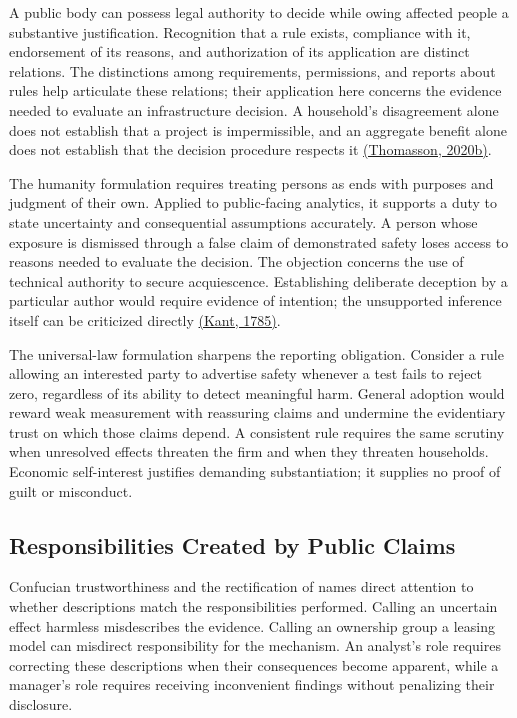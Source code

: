 A public body can possess legal authority to decide while owing affected
people a substantive justification. Recognition that a rule exists,
compliance with it, endorsement of its reasons, and authorization of its
application are distinct relations. The distinctions among requirements,
permissions, and reports about rules help articulate these relations;
their application here concerns the evidence needed to evaluate an
infrastructure decision. A household's disagreement alone does not
establish that a project is impermissible, and an aggregate benefit
alone does not establish that the decision procedure respects it
\href{https://academic.oup.com/book/33564}{(Thomasson, 2020b)}.

The humanity formulation requires treating persons as ends with purposes
and judgment of their own. Applied to public-facing analytics, it
supports a duty to state uncertainty and consequential assumptions
accurately. A person whose exposure is dismissed through a false claim
of demonstrated safety loses access to reasons needed to evaluate the
decision. The objection concerns the use of technical authority to
secure acquiescence. Establishing deliberate deception by a particular
author would require evidence of intention; the unsupported inference
itself can be criticized directly
\href{https://www.gutenberg.org/files/5682/5682-h/5682-h.htm}{(Kant,
1785)}.

The universal-law formulation sharpens the reporting obligation.
Consider a rule allowing an interested party to advertise safety
whenever a test fails to reject zero, regardless of its ability to
detect meaningful harm. General adoption would reward weak measurement
with reassuring claims and undermine the evidentiary trust on which
those claims depend. A consistent rule requires the same scrutiny when
unresolved effects threaten the firm and when they threaten households.
Economic self-interest justifies demanding substantiation; it supplies
no proof of guilt or misconduct.

\hypertarget{M09-responsibilities-created-by-public-claims}{%
\subsection{Responsibilities Created by Public
Claims}\label{M09-responsibilities-created-by-public-claims}}

\noindent \noindent Confucian trustworthiness and the rectification of names
direct attention to whether descriptions match the responsibilities
performed. Calling an uncertain effect harmless misdescribes the
evidence. Calling an ownership group a leasing model can misdirect
responsibility for the mechanism. An analyst's role requires correcting
these descriptions when their consequences become apparent, while a
manager's role requires receiving inconvenient findings without
penalizing their disclosure.

